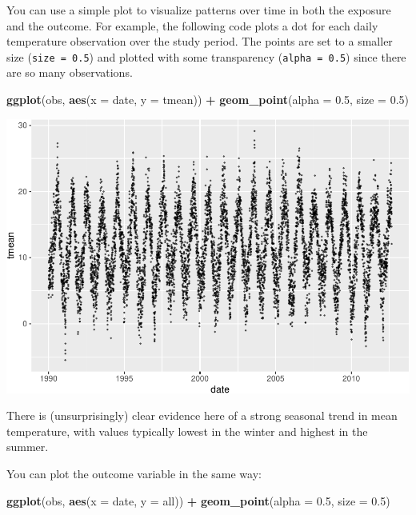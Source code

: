 \documentclass[
]{book}
\newenvironment{Shaded}{\begin{snugshade}}{\end{snugshade}}
\newcommand{\DataTypeTok}[1]{\textcolor[rgb]{0.13,0.29,0.53}{#1}}
\newcommand{\FloatTok}[1]{\textcolor[rgb]{0.00,0.00,0.81}{#1}}
\newcommand{\KeywordTok}[1]{\textcolor[rgb]{0.13,0.29,0.53}{\textbf{#1}}}
\newcommand{\NormalTok}[1]{#1}
\newcommand{\OperatorTok}[1]{\textcolor[rgb]{0.81,0.36,0.00}{\textbf{#1}}}
\newcommand{\StringTok}[1]{\textcolor[rgb]{0.31,0.60,0.02}{#1}}
\begin{document}
You can use a simple plot to visualize patterns over time in both the exposure
and the outcome. For example, the following code plots a dot for each daily
temperature observation over the study period. The points are set to a smaller
size (\texttt{size\ =\ 0.5}) and plotted with some transparency (\texttt{alpha\ =\ 0.5}) since
there are so many observations.

\begin{Shaded}
\begin{Highlighting}[]
\KeywordTok{ggplot}\NormalTok{(obs, }\KeywordTok{aes}\NormalTok{(}\DataTypeTok{x =}\NormalTok{ date, }\DataTypeTok{y =}\NormalTok{ tmean)) }\OperatorTok{+}\StringTok{ }
\StringTok{  }\KeywordTok{geom_point}\NormalTok{(}\DataTypeTok{alpha =} \FloatTok{0.5}\NormalTok{, }\DataTypeTok{size =} \FloatTok{0.5}\NormalTok{)}
\end{Highlighting}
\end{Shaded}

\includegraphics{adv_epi_analysis_files/figure-latex/unnamed-chunk-10-1.pdf}

There is (unsurprisingly) clear evidence here of a strong seasonal trend in mean temperature,
with values typically lowest in the winter and highest in the summer.

You can plot the outcome variable in the same way:

\begin{Shaded}
\begin{Highlighting}[]
\KeywordTok{ggplot}\NormalTok{(obs, }\KeywordTok{aes}\NormalTok{(}\DataTypeTok{x =}\NormalTok{ date, }\DataTypeTok{y =}\NormalTok{ all)) }\OperatorTok{+}\StringTok{ }
\StringTok{  }\KeywordTok{geom_point}\NormalTok{(}\DataTypeTok{alpha =} \FloatTok{0.5}\NormalTok{, }\DataTypeTok{size =} \FloatTok{0.5}\NormalTok{)}
\end{Highlighting}
\end{Shaded}
\end{document}
